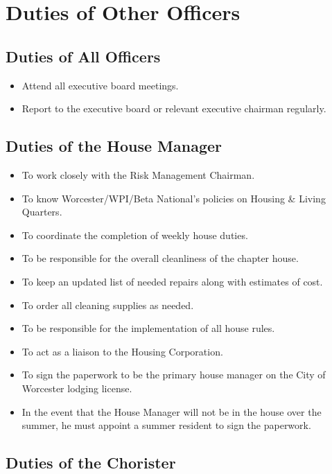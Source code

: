 \chapter{Duties of Other Officers}
\label{app:duties-of-other-officers}

\section{Duties of All Officers}
\label{sec:duties-of-all-officers}

\begin{itemize}
\item Attend all executive board meetings.
\item Report to the executive board or relevant executive chairman regularly.
\end{itemize}

\section{Duties of the House Manager}
\label{sec:duties-of-the-house-manager}

\begin{itemize}

\item To work closely with the Risk Management Chairman.
\item To know Worcester/WPI/Beta National’s policies on Housing \& Living
    Quarters.
\item To coordinate the completion of weekly house duties.
\item To be responsible for the overall cleanliness of the chapter house.
\item To keep an updated list of needed repairs along with estimates of cost.
\item To order all cleaning supplies as needed.
\item To be responsible for the implementation of all house rules.
\item To act as a liaison to the Housing Corporation.
\item To sign the paperwork to be the primary house manager on the City of
    Worcester lodging license.
\item In the event that the House Manager will not be in the house over the
    summer, he must appoint a summer resident to sign the paperwork.
\end{itemize}


\section{Duties of the Chorister}
\label{sec:duties-of-the-chorister}

